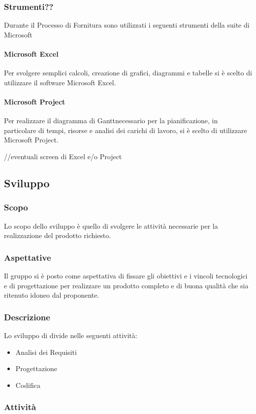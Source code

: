 \subsubsection{Strumenti??}
Durante il Processo di Fornitura sono utilizzati i seguenti strumenti della suite di Microsoft
\paragraph{Microsoft Excel}
Per svolgere semplici calcoli, creazione di grafici, diagrammi e tabelle si è scelto di utilizzare il software Microsoft Excel.
\paragraph{Microsoft Project}
Per realizzare il diagramma di Gantt\glosp necessario per la pianificazione, in particolare di tempi, risorse e analisi dei carichi di lavoro, si è scelto di utilizzare Microsoft Project.

//eventuali screen di Excel e/o Project

\subsection{Sviluppo}
	\subsubsection{Scopo}
Lo scopo dello sviluppo è quello di svolgere le attività necessarie per la realizzazione del prodotto richiesto.
\subsubsection{Aspettative}
Il gruppo si è posto come aspettativa di fissare gli obiettivi e i vincoli tecnologici e di progettazione per realizzare un prodotto completo e di buona qualità che sia ritenuto idoneo dal proponente.
\subsubsection{Descrizione}
Lo sviluppo di divide nelle seguenti attività:
\begin{itemize}
	\item Analisi dei Requisiti
	\item Progettazione
	\item Codifica
\end{itemize}
\subsubsection{Attività}
